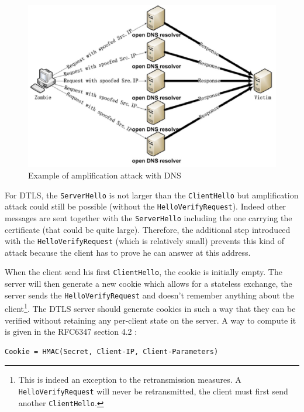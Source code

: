 \begin{figure}[!ht]
\centering
\includegraphics[width=\textwidth]{images/amplificationattacks}
\caption{Example of amplification attack with DNS}
\label{fig:amp_attack}
\end{figure}

For DTLS, the \texttt{ServerHello} is not larger than the \texttt{ClientHello} but amplification attack could still be possible (without the \texttt{HelloVerifyRequest}). Indeed other messages are sent together with the \texttt{ServerHello} including the one carrying the certificate (that could be quite large). Therefore, the additional step introduced with the \texttt{HelloVerifyRequest} (which is relatively small) prevents this kind of attack because the client has to prove he can answer at this address.



When the client send his first \texttt{ClientHello}, the cookie is initially empty. The server will then generate a new cookie which allows for a stateless exchange, the server sends the \texttt{HelloVerifyRequest} and doesn't remember anything about the client\footnote{This is indeed an exception to the retransmission measures. A \texttt{HelloVerifyRequest} will never be retransmitted, the client must first send another \texttt{ClientHello}.}. The DTLS server should generate cookies in such a way that they can be verified without retaining any per-client state on the server. A way to compute it is given in the RFC6347 section 4.2 \cite{rfc6347}:

\begin{lstlisting}
Cookie = HMAC(Secret, Client-IP, Client-Parameters)
\end{lstlisting}

